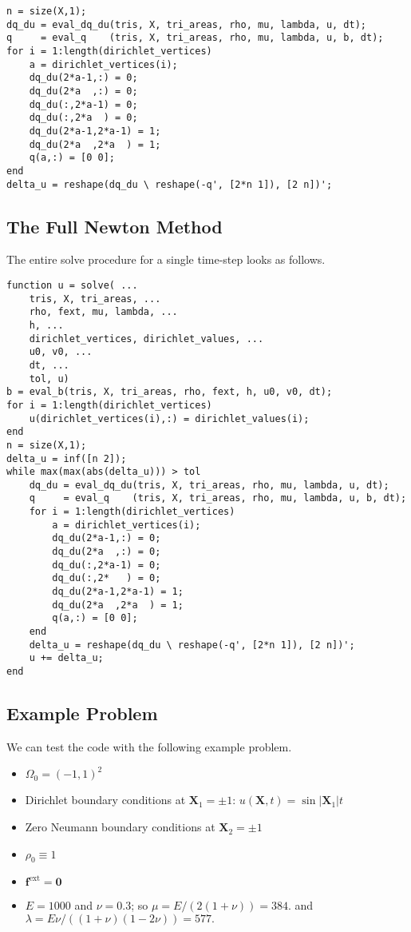 \documentclass{article}
\begin{document}
\begin{verbatim}
n = size(X,1);
dq_du = eval_dq_du(tris, X, tri_areas, rho, mu, lambda, u, dt);
q     = eval_q    (tris, X, tri_areas, rho, mu, lambda, u, b, dt);
for i = 1:length(dirichlet_vertices)
    a = dirichlet_vertices(i);
    dq_du(2*a-1,:) = 0;
    dq_du(2*a  ,:) = 0;
    dq_du(:,2*a-1) = 0;
    dq_du(:,2*a  ) = 0;
    dq_du(2*a-1,2*a-1) = 1;
    dq_du(2*a  ,2*a  ) = 1;
    q(a,:) = [0 0];
end
delta_u = reshape(dq_du \ reshape(-q', [2*n 1]), [2 n])';
\end{verbatim}

\subsection{The Full Newton Method}

The entire solve procedure for a single time-step looks as follows.

\begin{verbatim}
function u = solve( ...
    tris, X, tri_areas, ...
    rho, fext, mu, lambda, ...
    h, ...
    dirichlet_vertices, dirichlet_values, ...
    u0, v0, ...
    dt, ...
    tol, u)
b = eval_b(tris, X, tri_areas, rho, fext, h, u0, v0, dt);
for i = 1:length(dirichlet_vertices)
    u(dirichlet_vertices(i),:) = dirichlet_values(i);
end
n = size(X,1);
delta_u = inf([n 2]);
while max(max(abs(delta_u))) > tol
    dq_du = eval_dq_du(tris, X, tri_areas, rho, mu, lambda, u, dt);
    q     = eval_q    (tris, X, tri_areas, rho, mu, lambda, u, b, dt);
    for i = 1:length(dirichlet_vertices)
        a = dirichlet_vertices(i);
        dq_du(2*a-1,:) = 0;
        dq_du(2*a  ,:) = 0;
        dq_du(:,2*a-1) = 0;
        dq_du(:,2*   ) = 0;
        dq_du(2*a-1,2*a-1) = 1;
        dq_du(2*a  ,2*a  ) = 1;
        q(a,:) = [0 0];
    end
    delta_u = reshape(dq_du \ reshape(-q', [2*n 1]), [2 n])';
    u += delta_u;
end

\end{verbatim}

\subsection{Example Problem}

We can test the code with the following example problem.

\begin{itemize}
\item \(\Omega_0 = (-1,1)^2\)
\item Dirichlet boundary conditions at \(\mathbf{X}_1 = \pm 1\): \(u(\mathbf{X},t) = \sin \lvert \mathbf{X}_1 \rvert t\)
\item Zero Neumann boundary conditions at \(\mathbf{X}_2 = \pm 1\)
\item \(\rho_0 \equiv 1\)
\item \(\mathbf{f}^{\text{ext}} = \mathbf{0}\)
\item \(E = 1000\) and \(\nu = 0.3\); so \(\mu = E / (2 (1 + \nu)) = 384.\) and \(\lambda = E \nu / ((1 + \nu) (1 - 2\nu)) = 577.\)
\end{itemize}
\end{document}
